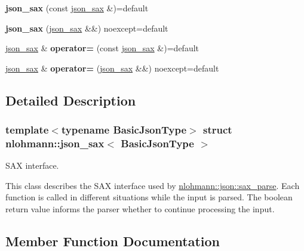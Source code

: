 \begin{DoxyCompactItemize}
\mbox{\label{structnlohmann_1_1json__sax_a8358c063b2d7222b3aafa62fded04403}} 
{\bfseries json\+\_\+sax} (const \hyperlink{structnlohmann_1_1json__sax}{json\+\_\+sax} \&)=default
\item 
\mbox{\label{structnlohmann_1_1json__sax_a62dae3713ca4914265904e30cd6b6347}} 
{\bfseries json\+\_\+sax} (\hyperlink{structnlohmann_1_1json__sax}{json\+\_\+sax} \&\&) noexcept=default
\item 
\mbox{\label{structnlohmann_1_1json__sax_a1a90dae111cf189ac9ad340a60b199b6}} 
\hyperlink{structnlohmann_1_1json__sax}{json\+\_\+sax} \& {\bfseries operator=} (const \hyperlink{structnlohmann_1_1json__sax}{json\+\_\+sax} \&)=default
\item 
\mbox{\label{structnlohmann_1_1json__sax_ac74584e3dc41f2465e69b37d7d2bf694}} 
\hyperlink{structnlohmann_1_1json__sax}{json\+\_\+sax} \& {\bfseries operator=} (\hyperlink{structnlohmann_1_1json__sax}{json\+\_\+sax} \&\&) noexcept=default
\end{DoxyCompactItemize}


\subsection{Detailed Description}
\subsubsection*{template$<$typename Basic\+Json\+Type$>$\newline
struct nlohmann\+::json\+\_\+sax$<$ Basic\+Json\+Type $>$}

S\+AX interface. 

This class describes the S\+AX interface used by \hyperlink{classnlohmann_1_1basic__json_a12b382c6407da5543827ce4b24bb5008}{nlohmann\+::json\+::sax\+\_\+parse}. Each function is called in different situations while the input is parsed. The boolean return value informs the parser whether to continue processing the input. 

\subsection{Member Function Documentation}
\mbox{\label{structnlohmann_1_1json__sax_a38c2dbde07138cc436ea7fbf22c1e92d}} 
